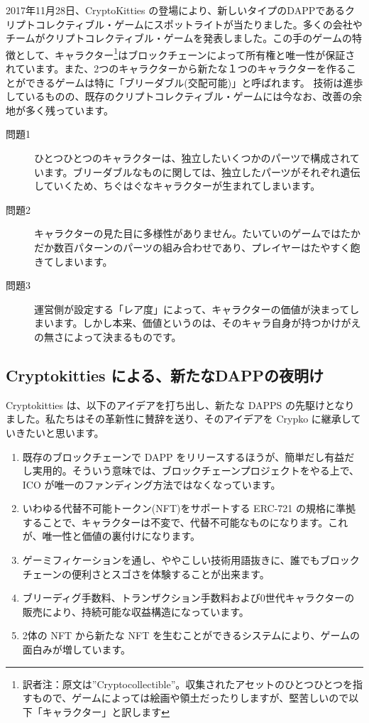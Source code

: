 \documentclass[xelatex,ja=standard]{bxjsarticle}
\begin{document}
2017年11月28日、CryptoKitties\cite{cryptokitties} の登場により、新しいタイプのDAPPであるクリプトコレクティブル・ゲームにスポットライトが当たりました。多くの会社やチームがクリプトコレクティブル・ゲームを発表しました\cite{cryptomons,cryptocountries,cryptopets,cryptoarts,cryptolandmarks,cryptofighters,etheremon,etherwaifu}。この手のゲームの特徴として、キャラクター\footnote{訳者注：原文は”Cryptocollectible”。収集されたアセットのひとつひとつを指すもので、ゲームによっては絵画や領土だったりしますが、堅苦しいので以下「キャラクター」と訳します}はブロックチェーンによって所有権と唯一性が保証されています。また、2つのキャラクターから新たな１つのキャラクターを作ることができるゲームは特に「ブリーダブル(交配可能)」と呼ばれます。
技術は進歩しているものの、既存のクリプトコレクティブル・ゲームには今なお、改善の余地が多く残っています。
\begin{description}
\item [問題1\label{problem:1}] ひとつひとつのキャラクターは、独立したいくつかのパーツで構成されています。ブリーダブルなものに関しては、独立したパーツがそれぞれ遺伝していくため、ちぐはぐなキャラクターが生まれてしまいます。
\item [問題2\label{problem:2}] キャラクターの見た目に多様性がありません。たいていのゲームではたかだか数百パターンのパーツの組み合わせであり、プレイヤーはたやすく飽きてしまいます。
\item [問題3\label{problem:3}] 運営側が設定する「レア度」によって、キャラクターの価値が決まってしまいます。しかし本来、価値というのは、そのキャラ自身が持つかけがえの無さによって決まるものです。
\end{description} 

\subsection{Cryptokitties による、新たなDAPPの夜明け}

Cryptokitties は、以下のアイデアを打ち出し、新たな DAPPS の先駆けとなりました。私たちはその革新性に賛辞を送り、そのアイデアを Crypko に継承していきたいと思います。

\begin{enumerate}
\item 既存のブロックチェーンで DAPP をリリースするほうが、簡単だし有益だし実用的。そういう意味では、ブロックチェーンプロジェクトをやる上で、ICO が唯一のファンディング方法ではなくなっています。
\item いわゆる代替不可能トークン(NFT)をサポートする ERC-721 の規格に準拠することで、キャラクターは不変で、代替不可能なものになります。これが、唯一性と価値の裏付けになります。
\item ゲーミフィケーションを通し、ややこしい技術用語抜きに、誰でもブロックチェーンの便利さとスゴさを体験することが出来ます。
\item ブリーディグ手数料、トランザクション手数料および0世代キャラクターの販売により、持続可能な収益構造になっています。
\item 2体の NFT から新たな NFT を生むことができるシステムにより、ゲームの面白みが増しています。
\end{enumerate}
\end{document}
